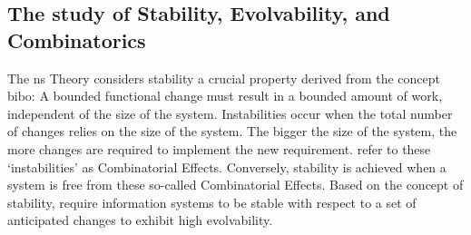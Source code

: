 \subsection{The study of Stability, Evolvability, and Combinatorics} \label{subsec_on_stability}

The \gls{ns} Theory considers stability a crucial property derived from the concept
\gls{bibo}: A bounded functional change must result in a bounded amount of work,
independent of the size of the system. Instabilities occur when the total number of
changes relies on the size of the system. The bigger the size of the system, the more
changes are required to implement the new requirement.
\textcite[271]{mannaert_normalized_2016} refer to these \enquote*{instabilities} as
Combinatorial Effects. Conversely, stability is achieved when a system is free from these
so-called Combinatorial Effects. Based on the concept of stability,
\textcite{mannaert_towards_2012} require information systems to be stable with respect to
a set of anticipated changes to exhibit high evolvability.